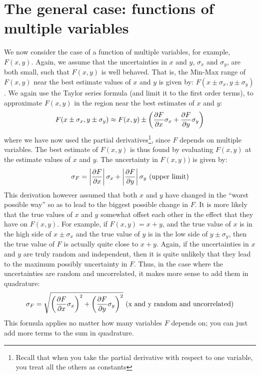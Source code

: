 \section{The general case: functions of multiple variables}

We now consider the case of a function of multiple variables, for example, $F(x,y)$. Again, we assume that the uncertainties in $x$ and $y$, $\sigma_{x}$ and $\sigma_{y}$, are both small, such that $F(x,y)$ is well behaved. That is, the Min-Max range of $F(x,y)$ near the best estimate values of $x$ and $y$ is given by: $F(x\pm\sigma_{x}, y\pm\sigma_{y})$. We again use the Taylor series formula (and limit it to the first order terms), to approximate $F(x,y)$ in the region near the best estimates of $x$ and $y$:
\begin{align}
F(x\pm\sigma_{x}, y\pm\sigma_{y})\approx F(x,y)\pm \left(\frac{\partial F}{\partial x}\sigma_{x} + \frac{\partial F}{\partial y} \sigma_{y}\right)
\end{align}
where we have now used the partial derivatives\footnote{Recall that when you take the partial derivative with respect to one variable, you treat all the others as constants}, since $F$ depends on multiple variables. The best estimate of $F(x,y)$ is thus found by evaluating $F(x,y)$ at the estimate values of $x$ and $y$. The uncertainty in $F(x,y))$ is given by:
\begin{align}
\label{eqn:maxDerivError}
\sigma_{F} =\left| \frac{\partial F}{\partial x} \right| \sigma_{x} +  \left| \frac{\partial F}{\partial y} \right| \sigma_{y} \text{      (upper limit)}
\end{align}
This derivation however assumed that both $x$ and $y$ have changed in the ``worst possible way'' so as to lead to the biggest possible change in $F$. It is more likely that the true values of $x$ and $y$ somewhat offset each other in the effect that they have on $F(x,y)$. For example, if $F(x,y)=x+y$, and the true value of $x$ is in the high side of $x\pm \sigma_{x}$ and the true value of $y$ is in the low side of $y \pm \sigma_{y}$, then the true value of $F$ is actually quite close to $x+y$. Again, if the uncertainties in $x$ and $y$ are truly random and independent, then it is quite unlikely that they lead to the maximum possibly uncertainty in $F$. Thus, in the case where the uncertainties are random and uncorrelated, it makes more sense to add them in quadrature:
\begin{align}
\label{eqn:derivPropagate}
\sigma_{F} = \sqrt{\left(\frac{\partial F}{\partial x}\sigma_{x}\right)^2 + \left(\frac{\partial F}{\partial y} \sigma_{y}\right)^2}\text{      (x and y random and uncorrelated)}
\end{align}
This formula applies no matter how many variables $F$ depends on; you can just add more terms to the sum in quadrature. 

